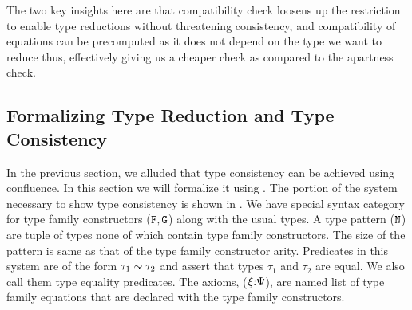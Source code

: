 \documentclass[format=acmsmall,manuscript,screen,nonacm,margin=1in,11pt]{acmart}
\begin{document}
The two key insights here are that compatibility check loosens up the restriction
to enable type reductions without threatening consistency, and compatibility of equations
can be precomputed as it does not depend on the type we want to reduce
thus, effectively giving us a cheaper check as compared to the apartness check.

\subsection{Formalizing Type Reduction and Type Consistency}\label{subsec:tf-closed-formal}
In the previous section, we alluded that type consistency can be achieved using
confluence. In this section we will formalize it using \CLTF. The portion of the system necessary
to show type consistency is shown in . We have special syntax category for
type family constructors ($\texttt{F},\texttt{G}$) along with the usual types.
A type pattern ($\texttt{N}$) are tuple of types none of which contain type family constructors.
The size of the pattern is same as that of the type family constructor arity.
Predicates in this system are of the form $\tau_1\mathrel{\sim} \tau_2$ and assert that types $\tau_1$ and $\tau_2$ are equal.
We also call them type equality predicates. The axioms, ($\xi{:}\Psi$),
are named list of type family equations that are declared with the type family constructors.
\end{document}

